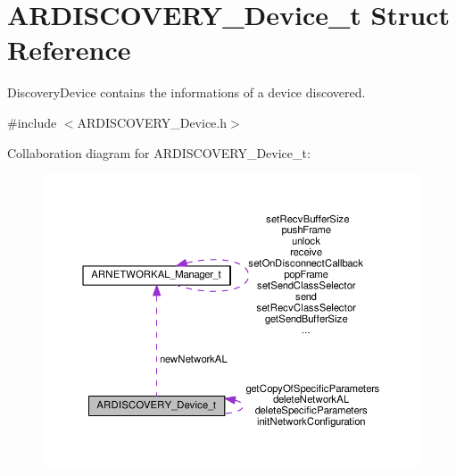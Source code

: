 \hypertarget{struct_a_r_d_i_s_c_o_v_e_r_y___device__t}{}\section{A\+R\+D\+I\+S\+C\+O\+V\+E\+R\+Y\+\_\+\+Device\+\_\+t Struct Reference}
\label{struct_a_r_d_i_s_c_o_v_e_r_y___device__t}


Discovery\+Device contains the informations of a device discovered.  




{\ttfamily \#include $<$A\+R\+D\+I\+S\+C\+O\+V\+E\+R\+Y\+\_\+\+Device.\+h$>$}



Collaboration diagram for A\+R\+D\+I\+S\+C\+O\+V\+E\+R\+Y\+\_\+\+Device\+\_\+t\+:
\nopagebreak
\begin{figure}[H]
\begin{center}
\leavevmode
\includegraphics[width=350pt]{struct_a_r_d_i_s_c_o_v_e_r_y___device__t__coll__graph}
\end{center}
\end{figure}
